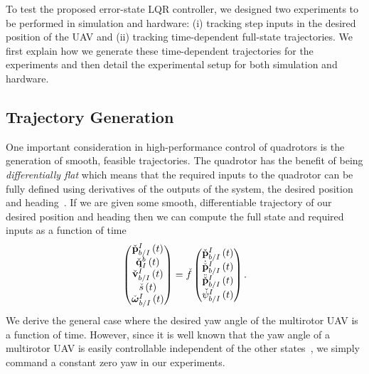 
To test the proposed error-state LQR controller, we designed two experiments to be
performed in simulation and hardware: (i) tracking step inputs in the desired
position of the UAV and (ii) tracking time-dependent full-state trajectories. We
first explain how we generate these time-dependent trajectories for the
experiments and then detail the experimental setup for both simulation and
hardware.


\subsection{Trajectory Generation}
\label{subsec:trajectory_gen}

One important consideration in high-performance control of quadrotors is the
generation of smooth, feasible trajectories.  The quadrotor has the benefit of
being \emph{differentially flat} which means that the required inputs to the
quadrotor can be fully defined using derivatives of the outputs of the system,
the desired position and
heading~\cite{mellinger2011minimum}. If we are given some smooth, differentiable trajectory of our desired
position and heading then we can compute the full state and required inputs as
a function of time
\begin{equation}
	\begin{pmatrix} \check{\boldsymbol{\mathrm{p}}}_{b/I}^I \left( t \right) \\
	                \check{\boldsymbol{\mathrm{q}}}_I^b \left( t \right) \\
	                \check{\boldsymbol{\mathrm{v}}}_{b/I}^I \left( t \right) \\
	                \check{s} \left( t \right) \\
	                \check{\boldsymbol{\mathrm{\omega}}}_{b/I}^I \left( t \right)
	\end{pmatrix} = 
	\check{f} \begin{pmatrix} 
					\check{\boldsymbol{\mathrm{p}}}_{b/I}^I\left(t\right) \\ 
					\dot{\check{\boldsymbol{\mathrm{p}}}}_{b/I}^I\left(t\right) \\ 
					\ddot{\check{\boldsymbol{\mathrm{p}}}}_{b/I}^I\left(t\right) \\ 
					\check{\psi}_{b/I}^I\left(t\right)
	\end{pmatrix}.
\end{equation}
We derive the general case where the desired yaw angle of the multirotor UAV is
a function of time. However, since it is well known that the yaw angle of a multirotor UAV is
easily controllable independent of the other states~\cite{mellinger2011minimum}, we simply command a constant zero yaw in our experiments. 

